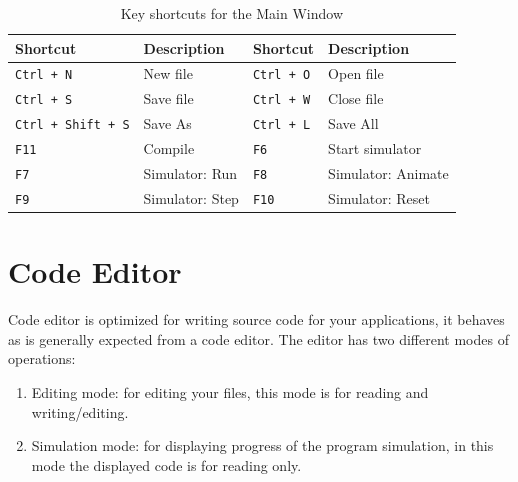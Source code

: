             \begin{table}[h!]
                \centering
                \fontsize{8pt}{9pt}
                {
                    \begin{tabular}{|ll|ll|}
                        \hline
                        \textbf{Shortcut}               & \textbf{Description}          &
                        \textbf{Shortcut}               & \textbf{Description}          \\\hline
                        \texttt{Ctrl + N}               & New file                      &
                        \texttt{Ctrl + O}               & Open file                     \\
                        \texttt{Ctrl + S}               & Save file                     &
                        \texttt{Ctrl + W}               & Close file                    \\
                        \texttt{Ctrl + Shift + S}       & Save As                       &
                        \texttt{Ctrl + L}               & Save All                      \\
                        \texttt{F11}                    & Compile                       &
                        \texttt{F6}                     & Start simulator               \\
                        \texttt{F7}                     & Simulator: Run                &
                        \texttt{F8}                     & Simulator: Animate            \\
                        \texttt{F9}                     & Simulator: Step               &
                        \texttt{F10}                    & Simulator: Reset              \\
                        \hline
                    \end{tabular}
                }
                \caption{Key shortcuts for the Main Window}
            \end{table}

\clearpage
\section{Code Editor}
    Code editor is optimized for writing source code for your applications, it behaves as is generally expected from a code editor. The editor has two different modes of operations:

    \begin{enumerate}
        \item Editing mode: for editing your files, this mode is for reading and writing/editing.
        \item Simulation mode: for displaying progress of the program simulation, in this mode the displayed code is for reading only.
    \end{enumerate}

